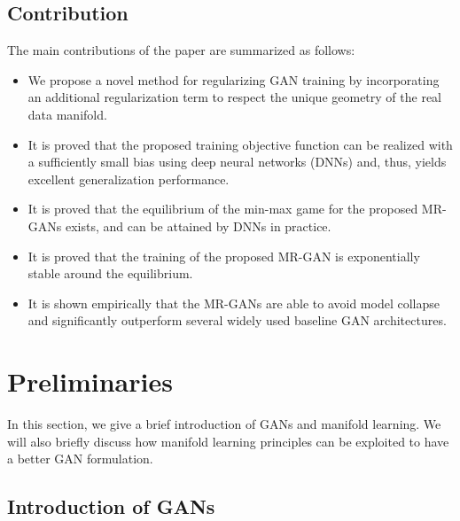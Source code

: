 \documentclass[10pt,twocolumn,letterpaper]{article}
\begin{document}
\subsection{Contribution}
The main contributions of the paper are summarized as follows:
\begin{itemize}
    \item We propose a novel method for regularizing GAN training by incorporating an additional regularization term to respect the unique geometry of the real data manifold.
    
	\item It is proved that the proposed training objective function can be realized with a sufficiently small bias using deep neural networks (DNNs) and, thus, {{yields excellent generalization performance}}.
	
	\item It is proved that the equilibrium of the min-max game for the proposed MR-GANs exists, and can be attained by DNNs in practice.
	
	\item It is proved that the training of the proposed MR-GAN is exponentially stable around the equilibrium.

	\item It is shown empirically that the MR-GANs are able to avoid model collapse and significantly outperform several widely used baseline GAN architectures.

\end{itemize}

\section{Preliminaries}
In this section, we give a brief introduction of GANs and manifold learning. We will also briefly discuss how manifold learning principles can be exploited to have a better GAN formulation. 

\subsection{Introduction of GANs}
\end{document}
